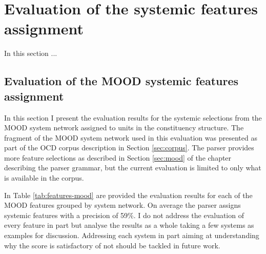     
    
\section{Evaluation of the systemic features assignment}
\label{sec:systemic-evaluation}
    In this section ... 
    
    
\subsection{Evaluation of the MOOD systemic features assignment}
\label{sec:systemic-evaluation-MOOD}

    In this section I present the evaluation results for the systemic selections from the MOOD system network assigned to units in the constituency structure. The fragment of the MOOD system network used in this evaluation was presented as part of the OCD corpus description in Section \ref{sec:corpus}. The parser provides more feature selections as described in Section \ref{sec:mood} of the chapter describing the parser grammar, but the current evaluation is limited to only what is available in the corpus.

    In Table \ref{tab:features-mood} are provided the evaluation results for each of the MOOD features grouped by system network. On average the parser assigns systemic features with a precision of 59\%. I do not address the evaluation of every feature in part but analyse the results as a whole taking a few systems as examples for discussion. Addressing each system in part aiming at understanding why the score is satisfactory of not should be tackled in future work.

